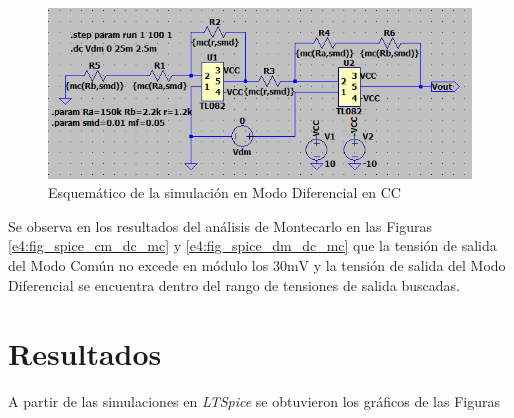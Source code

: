 \begin{figure}[!ht]
\begin{center}
\includegraphics[width=\linewidth]{res/spice/spice_dm_dc_sch.png}
\caption{Esquemático de la simulación en Modo Diferencial en CC}
\label{e4:fig_spice_dm_dc}
\end{center}
\end{figure}

Se observa en los resultados del análisis de Montecarlo en las Figuras \ref{e4:fig_spice_cm_dc_mc} y \ref{e4:fig_spice_dm_dc_mc} que la tensión de salida del Modo Común no excede en módulo los $30 \si{\milli\volt}$ y la tensión de salida del Modo Diferencial se encuentra dentro del rango de tensiones de salida buscadas.



\section{Resultados}

A partir de las simulaciones en \textit{LTSpice} se obtuvieron los gráficos de las Figuras 

